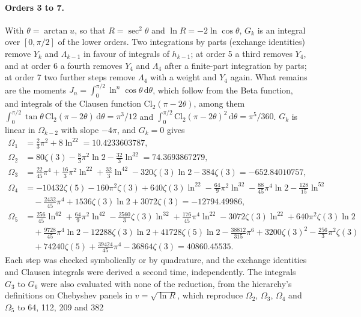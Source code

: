 \documentclass[11pt]{article}
\theoremstyle{remark}
\newcommand{\dd}{\mathrm{d}}
\begin{document}
\paragraph{Orders 3 to 7.} With $\theta=\arctan u$, so that $R=\sec^2\theta$ and $\ln R=-2\ln\cos\theta$, $G_k$ is an
integral over $[0,\pi/2]$ of the lower orders. Two integrations by parts (exchange identities) remove $Y_k$ and
$\Lambda_{k-1}$ in favour of integrals of $h_{k-1}$; at order 5 a third removes $Y_4$, and at order 6 a fourth removes
$Y_4$ and $\Lambda_4$ after a finite-part integration by parts; at order 7 two further steps remove $\Lambda_4$ with a weight
and $Y_4$ again. What remains are the moments
$J_n=\int_0^{\pi/2}\ln^n\!\cos\theta\,\dd\theta$, which follow from the Beta function, and integrals of the Clausen
function $\mathrm{Cl}_2(\pi-2\theta)$, among them $\int_0^{\pi/2}\tan\theta\,\mathrm{Cl}_2(\pi-2\theta)\,\dd\theta=\pi^3/12$
and $\int_0^{\pi/2}\mathrm{Cl}_2(\pi-2\theta)^2\,\dd\theta=\pi^5/360$. $G_k$ is linear in $\Omega_{k-2}$ with slope $-4\pi$,
and $G_k=0$ gives
\begin{align}
\Omega_1&=\tfrac23\pi^2+8\ln^22=10.4233603787,\\
\Omega_2&=80\zeta(3)-\tfrac83\pi^2\ln2-\tfrac{32}{3}\ln^32=74.3693867279,\\
\Omega_3&=\tfrac{22}{45}\pi^4+\tfrac{16}{3}\pi^2\ln^22+\tfrac{32}{3}\ln^42-320\zeta(3)\ln2-384\zeta(3)=-652.84010757,\\
\Omega_4&=-10432\zeta(5)-160\pi^2\zeta(3)+640\zeta(3)\ln^22-\tfrac{64}{9}\pi^2\ln^32-\tfrac{88}{45}\pi^4\ln2-\tfrac{128}{15}\ln^52\nonumber\\
&\quad-\tfrac{2432}{45}\pi^4+1536\zeta(3)\ln2+3072\zeta(3)=-12794.49986,\\
\Omega_5&=\tfrac{256}{45}\ln^62+\tfrac{64}{9}\pi^2\ln^42-\tfrac{2560}{3}\zeta(3)\ln^32+\tfrac{176}{45}\pi^4\ln^22-3072\zeta(3)\ln^22+640\pi^2\zeta(3)\ln2\nonumber\\
&\quad+\tfrac{9728}{45}\pi^4\ln2-12288\zeta(3)\ln2+41728\zeta(5)\ln2-\tfrac{38812}{315}\pi^6+3200\zeta(3)^2-\tfrac{256}{3}\pi^2\zeta(3)\nonumber\\
&\quad+74240\zeta(5)+\tfrac{39424}{45}\pi^4-36864\zeta(3)=40860.45535.
\end{align}
Each step was checked symbolically or by quadrature, and the exchange identities and Clausen integrals were derived a
second time, independently. The integrals $G_3$ to $G_6$ were also evaluated with none of the reduction, from the
hierarchy's definitions on Chebyshev panels in $v=\sqrt{\ln R}$, which reproduce $\Omega_2$, $\Omega_3$, $\Omega_4$ and $\Omega_5$ to 64, 112, 209 and 382
\end{document}
